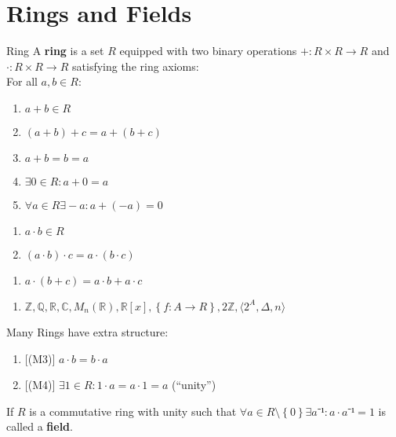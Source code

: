 \documentclass[english]{lbscript}
\begin{document}
\section{Rings and Fields}
\label{sec:rings-fields}

\begin{definition}{Ring}{}
	A \textbf{ring} is a set \(R\) equipped with two binary operations \(+:R×R→R\) and \(⋅:R×R→R\) satisfying the ring axioms:\\
	For all \(a, b∈R:\)
	\begin{enumerate}[label=(A\arabic{*})]
		\item\label{item:45} \(a+b∈R\)
		\item\label{item:46} \((a+b)+c=a+(b+c)\)
		\item\label{item:47} \(a+b=b=a\)
		\item\label{item:48} \(∃0∈R:a+0=a\)
		\item\label{item:49} \(∀a∈R∃-a: a+(-a)=0\)
	\end{enumerate}
	\begin{enumerate}[label=(M\arabic{*})]
		\item\label{item:50} \(a⋅b∈R\)
		\item\label{item:51} \((a⋅b)⋅c=a⋅(b⋅c)\)
	\end{enumerate}
	\begin{enumerate}[label=(D)]
		\item\label{item:52} \(a⋅(b+c)=a⋅b+a⋅c\)
	\end{enumerate}
\end{definition}

\begin{example}{}{}
	\begin{enumerate}
		\item\label{item:53} \(ℤ, ℚ, ℝ, ℂ, M_{n}(ℝ), ℝ[x], \left\{ f: A→R \right\}, 2ℤ, ⟨2^{A}, 𝛥, n⟩ \)
	\end{enumerate}
\end{example}
\begin{remark}{}{}
	Many Rings have extra structure:
	\begin{enumerate}
		\item\label{item:54}[(M3)] \(a⋅b=b⋅a\)
		\item\label{item:55}[(M4)] \(∃1∈R: 1⋅a=a⋅1=a\) (\enquote{unity})
	\end{enumerate}
\end{remark}

\begin{definition}{}{}
	If \(R\) is a commutative ring with unity such that \(∀a∈R\setminus\left\{0\right\}∃a⁻¹: a⋅a⁻¹=1 \) is called a \textbf{field}.
\end{definition}
\end{document}
